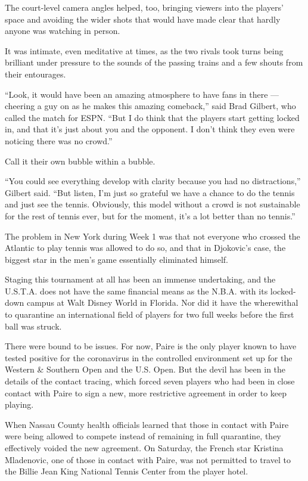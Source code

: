 The court-level camera angles helped, too, bringing viewers into the
players' space and avoiding the wider shots that would have made clear
that hardly anyone was watching in person.

It was intimate, even meditative at times, as the two rivals took turns
being brilliant under pressure to the sounds of the passing trains and a
few shouts from their entourages.

``Look, it would have been an amazing atmosphere to have fans in there
--- cheering a guy on as he makes this amazing comeback,'' said Brad
Gilbert, who called the match for ESPN. ``But I do think that the
players start getting locked in, and that it's just about you and the
opponent. I don't think they even were noticing there was no crowd.''

Call it their own bubble within a bubble.

``You could see everything develop with clarity because you had no
distractions,'' Gilbert said. ``But listen, I'm just so grateful we have
a chance to do the tennis and just see the tennis. Obviously, this model
without a crowd is not sustainable for the rest of tennis ever, but for
the moment, it's a lot better than no tennis.''

The problem in New York during Week 1 was that not everyone who crossed
the Atlantic to play tennis was allowed to do so, and that in Djokovic's
case, the biggest star in the men's game essentially eliminated himself.

Staging this tournament at all has been an immense undertaking, and the
U.S.T.A. does not have the same financial means as the N.B.A. with its
locked-down campus at Walt Disney World in Florida. Nor did it have the
wherewithal to quarantine an international field of players for two full
weeks before the first ball was struck.

There were bound to be issues. For now, Paire is the only player known
to have tested positive for the coronavirus in the controlled
environment set up for the Western \& Southern Open and the U.S. Open.
But the devil has been in the details of the contact tracing, which
forced seven players who had been in close contact with Paire to sign a
new, more restrictive agreement in order to keep playing.

When Nassau County health officials learned that those in contact with
Paire were being allowed to compete instead of remaining in full
quarantine, they effectively voided the new agreement. On Saturday, the
French star Kristina Mladenovic, one of those in contact with Paire, was
not permitted to travel to the Billie Jean King National Tennis Center
from the player hotel.

